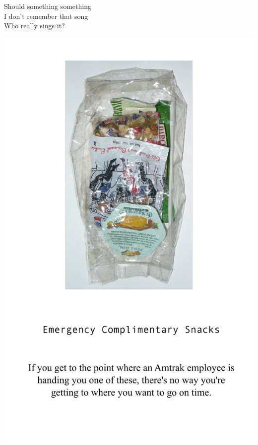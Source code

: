 \documentclass[12pt]{article}
\begin{document}
Should something something \\
I don't remember that song \\
Who really sings it?


\newpage

\includegraphics{back.png}

\newpage
\end{document}
